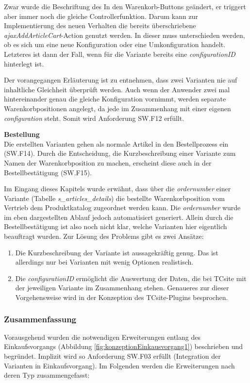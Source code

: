 \documentclass[11pt, a4paper, titlepage, listof=totoc, bibliography=totoc, index=totoc, twoside, openright, headings=normal, draft]{scrreprt}
\begin{document}
Zwar wurde die Beschriftung des \glqq In den Warenkorb\grqq{}-Buttons geändert, er triggert aber immer noch die gleiche Controllerfunktion. Darum kann zur Implementierung des neuen Verhalten die bereits überschriebene \emph{ajaxAddArticleCart}-Action genutzt werden. In dieser muss unterschieden werden, ob es sich um eine neue Konfiguration oder eine Umkonfiguration handelt. Letzteres ist dann der Fall, wenn für die Variante bereits eine \emph{configurationID} hinterlegt ist.

Der vorangegangen Erläuterung ist zu entnehmen, dass zwei Varianten nie auf inhaltliche Gleichheit überprüft werden. Auch wenn der Anwender zwei mal hintereinander genau die gleiche Konfiguration vornimmt, werden separate Warenkorbpositionen angelegt, da jede im Zusammenhang mit einer eigenen \emph{configuration} steht. Somit wird Anforderung SW.F12 erfüllt.

\textbf{Bestellung}\\
Die erstellten Varianten gehen als normale Artikel in den Bestellprozess ein (SW.F14). Durch die Entscheidung, die Kurzbeschreibung einer Variante zum Namen der Warenkorbposition zu machen, erscheint diese auch in der Bestellbestätigung (SW.F15).

Im Eingang dieses Kapitels wurde erwähnt, dass über die \emph{ordernumber} einer Variante (Tabelle \emph{s\_articles\_details}) die bestellte Warenkorbposition vom Vertrieb dem Produktkatalog zugeordnet werden kann. Die \emph{ordernumber} wurde im eben dargestellten Ablauf jedoch automatisiert generiert. Allein durch die Bestellbestätigung ist also noch nicht klar, welche Varianten hier eigentlich beauftragt wurden. Zur Lösung des Problems gibt es zwei Ansätze:
\begin{enumerate}
\item Die Kurzbeschreibung der Variante ist aussagekräftig genug. Das ist allerdings nur bei Varianten mit wenig Optionen realistisch.
\item Die \emph{configurationID} ermöglicht die Auswertung der Daten, die bei TCsite mit der jeweiligen Variante im Zusammenhang stehen. Genaueres zur dieser Vorgehensweise wird in der Konzeption des TCsite-Plugins besprochen.
\end{enumerate}

\subsubsection{Zusammenfassung}
Vorausgehend wurden die notwendigen Erweiterungen entlang des Einkaufsvorgangs (Abbildung \ref{fig:konzeptionEinkausvorgang1}) 
beschrieben und begründet. Implizit wird so Anforderung SW.F03 erfüllt (Integration der Varianten in Einkaufsvorgang). Im Folgenden werden die Erweiterungen nach deren Typ zusammengefasst:
 
\end{document}
